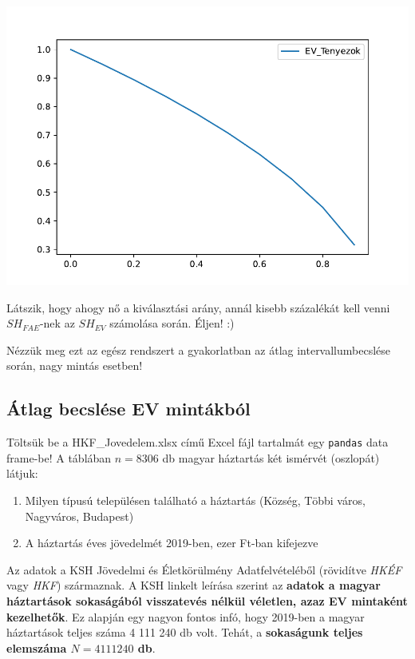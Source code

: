 \documentclass[
]{book}
\providecommand{\tightlist}{%
  \setlength{\itemsep}{0pt}\setlength{\parskip}{0pt}}
\begin{document}
\includegraphics{_main_files/figure-latex/unnamed-chunk-314-21.pdf}

Látszik, hogy ahogy nő a kiválasztási arány, annál kisebb százalékát kell venni \(SH_{FAE}\)-nek az \(SH_{EV}\) számolása során. Éljen! :)

Nézzük meg ezt az egész rendszert a gyakorlatban az átlag intervallumbecslése során, nagy mintás esetben!

\subsection{Átlag becslése EV mintákból}\label{uxe1tlag-becsluxe9se-ev-mintuxe1kbuxf3l}

Töltsük be a HKF\_Jovedelem.xlsx című Excel fájl tartalmát egy \texttt{pandas} data frame-be!
A táblában \(n=8306\) db magyar háztartás két ismérvét (oszlopát) látjuk:

\begin{enumerate}
\def\labelenumi{\arabic{enumi}.}
\tightlist
\item
  Milyen típusú településen található a háztartás (Község, Többi város, Nagyváros, Budapest)
\item
  A háztartás éves jövedelmét 2019-ben, ezer Ft-ban kifejezve
\end{enumerate}

Az adatok a KSH Jövedelmi és Életkörülmény Adatfelvételéből (rövidítve \emph{HKÉF} vagy \emph{HKF}) származnak. A KSH linkelt leírása szerint az \textbf{adatok a magyar háztartások sokaságából visszatevés nélkül véletlen, azaz EV mintaként kezelhetők}.
Ez alapján egy nagyon fontos infó, hogy 2019-ben a magyar háztartások teljes száma 4 111 240 db volt. Tehát, a \textbf{sokaságunk teljes elemszáma \(N=4111240\) db}.
\end{document}
